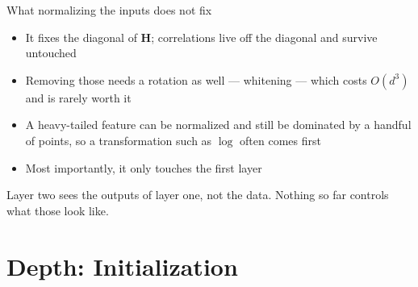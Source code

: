 \documentclass[aspectratio=169, 11pt]{beamer}
\begin{document}
\begin{frame}{What normalizing the inputs does not fix}
  \vspace{0.2em}
  \begin{itemize}\itemsep0.35em
    \item It fixes the \alert{diagonal} of $\mathbf{H}$; correlations live off
          the diagonal and survive untouched
    \item Removing those needs a rotation as well --- whitening ---
          which costs $O(d^3)$ and is rarely worth it
    \item A heavy-tailed feature can be normalized and still be
          dominated by a handful of points, so a transformation such as
          $\log$ often comes first
    \item Most importantly, it only touches the \alert{first} layer
  \end{itemize}
  \begin{redhighlight}
    Layer two sees the outputs of layer one, not the data. Nothing so
    far controls what those look like.
  \end{redhighlight}
\end{frame}

\section{Depth: Initialization}
\end{document}
